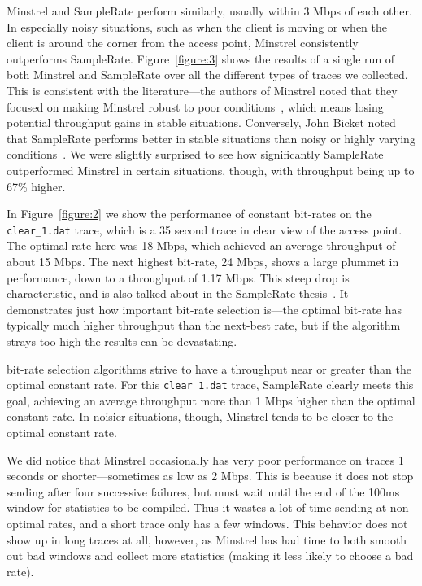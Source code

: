 \documentclass[letterpaper,twocolumn,10pt]{article}
\begin{document}
Minstrel and SampleRate perform similarly, usually within 3 Mbps of each other. In especially noisy situations, such as when the client is moving or when the client is around the corner from the access point, Minstrel consistently outperforms SampleRate. Figure~\ref{figure:3} shows the results of a single run of both Minstrel and SampleRate over all the different types of traces we collected. This is consistent with the literature---the authors of Minstrel noted that they focused on making Minstrel robust to poor conditions~\cite{minstrel}, which means losing potential throughput gains in stable situations. Conversely, John Bicket noted that SampleRate performs better in stable situations than noisy or highly varying conditions~\cite{samplerate}. We were slightly surprised to see how significantly SampleRate outperformed Minstrel in certain situations, though, with throughput being up to 67\% higher. 

In Figure~\ref{figure:2} we show the performance of constant bit-rates on the \texttt{clear\_1.dat} trace, which is a 35 second trace in clear view of the access point. The optimal rate here was 18 Mbps, which achieved an average throughput of about 15 Mbps. The next highest bit-rate, 24 Mbps, shows a large plummet in performance, down to a throughput of 1.17 Mbps. This steep drop is characteristic, and is also talked about in the SampleRate thesis~\cite{samplerate}. It demonstrates just how important bit-rate selection is---the optimal bit-rate has typically much higher throughput than the next-best rate, but if the algorithm strays too high the results can be devastating. 

bit-rate selection algorithms strive to have a throughput near or greater than the optimal constant rate. For this \texttt{clear\_1.dat} trace, SampleRate clearly meets this goal, achieving an average throughput more than 1 Mbps higher than the optimal constant rate. In noisier situations, though, Minstrel tends to be closer to the optimal constant rate. 

We did notice that Minstrel occasionally has very poor performance on traces 1 seconds or shorter---sometimes as low as 2 Mbps. This is because it does not stop sending after four successive failures, but must wait until the end of the 100ms window for statistics to be compiled. Thus it wastes a lot of time sending at non-optimal rates, and a short trace only has a few windows. This behavior does not show up in long traces at all, however, as Minstrel has had time to both smooth out bad windows and collect more statistics (making it less likely to choose a bad rate).
\end{document}
